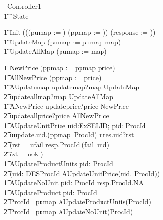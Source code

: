\begin{circus}
	\circprocess\ Controller1 \circdef \circbegin \\

    	\t1 \circstate\ State 

    	\t1	Init \circdef (((pumap := \emptyset) \circseq (ppmap := \emptyset)) \circseq (response := \emptyset))\\

        \t1 UpdateMap \circdef (pumap := pumap \oplus map) \\
        \t1 UpdateAllMap \circdef (pumap := map)

        \t1 NewPrice \circdef (ppmap := ppmap \oplus price) \\
        \t1 AllNewPrice \circdef (ppmap := price) \\

        \t1 AUpdatemap \circdef updatemap?map \then  UpdateMap \\
            \t2 \extchoice updateallmap?map \then  UpdateAllMap \\

        \t1 ANewPrice \circdef updateprice?price \then  NewPrice \\
            \t2 \extchoice updateallprice?price \then  AllNewPrice \\
        \t1 AUpdateUnitPrice \circdef uid:ExSELID; pid: ProcId \circspot \\
            \t2 uupdate.uid.(ppmap~ProcId) \then ures.uid?rst \then \\
            \t2 (\lcircguard rst = ufail \rcircguard \circguard resp.ProcId.(fail~uid) \then \Skip \\
            \t2 \extchoice \lcircguard rst = uok \rcircguard \circguard \Skip)\\

        \t1 AUpdateProductUnits \circdef pid: ProcId \circspot \\
            \t2 (\Interleave uid: DESProcId \circspot AUpdateUnitPrice(uid, ProcId)) \\

        \t1 AUpdateNoUnit \circdef  pid: ProcId \circspot resp.ProcId.NA \then \Skip \\

        \t1 AUpdateProduct \circdef pid: ProcId \circspot \\
            \t2   \lcircguard ProcId \in \ran~pumap \rcircguard \circguard AUpdateProductUnits(ProcId) \\
            \t2 \extchoice \lcircguard ProcId \notin \ran~pumap \rcircguard \circguard AUpdateNoUnit(ProcId) \\


\end{circus}
